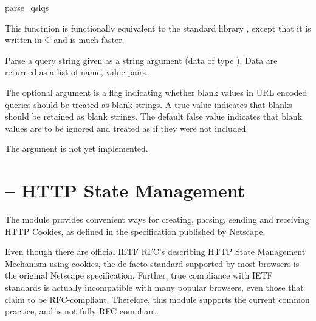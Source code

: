 \begin{funcdesc}{parse_qsl}{qs}

  This functnion is functionally equivalent to the standard library
   , except that it is written in C and is
  much faster. 

  Parse a query string given as a string argument (data of type
  ).  Data are
  returned as a list of name, value pairs.

  The optional argument  is a flag indicating
  whether blank values in URL encoded queries should be treated as blank
  strings.  A true value indicates that blanks should be retained as
  blank strings.  The default false value indicates that blank values
  are to be ignored and treated as if they were not included.

  \begin{notice}
    The  argument is not yet implemented.
  \end{notice}

\end{funcdesc}

\section{ -- HTTP State Management\label{pyapi-cookie}}

The  module provides convenient ways for creating,
parsing, sending and receiving HTTP Cookies, as defined in the
specification published by Netscape.

\begin{notice}
  Even though there are official IETF RFC's describing HTTP State
  Management Mechanism using cookies, the de facto standard supported by
  most browsers is the original Netscape specification.  Further, true
  compliance with IETF standards is actually incompatible with many
  popular browsers, even those that claim to be RFC-compliant.
  Therefore, this module supports the current common practice, and is
  not fully RFC compliant.
\end{notice}

\begin{seealso}
\end{seealso}

